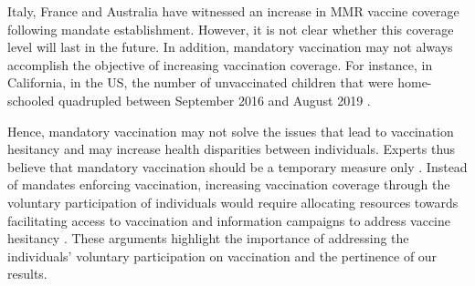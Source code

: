 Italy, France and Australia have witnessed an increase in MMR vaccine coverage following mandate establishment. However, it is not clear whether this coverage level will last in the future. In addition, mandatory vaccination may not always accomplish the objective of increasing vaccination coverage. For instance, in California, in the US, the number of unvaccinated children that were home-schooled quadrupled between September 2016 and August 2019 \cite[]{Drew2019}. 

Hence, mandatory vaccination may not solve the issues that lead to vaccination hesitancy and may increase health disparities between individuals. Experts thus believe that mandatory vaccination should be a temporary measure only \cite[]{Bechini2019}. Instead of mandates enforcing vaccination, increasing vaccination coverage through the voluntary participation of individuals would require allocating resources towards facilitating access to vaccination and information campaigns to address vaccine hesitancy \cite[]{Drew2019,Bechini2019}. These arguments highlight the importance of addressing the individuals' voluntary participation on vaccination and the pertinence of our results.